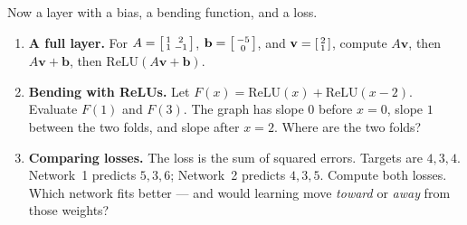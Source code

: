 \documentclass[10pt]{article}
\newcommand{\vv}{\mathbf{v}}
\newcommand{\bb}{\mathbf{b}}
\newcommand{\relu}{\mathrm{ReLU}}
\begin{document}
\begin{tcolorbox}[colback=white, colframe=black!40, title=\textbf{Tier A --- Approaching Proficiency},
    fonttitle=\bfseries, arc=1.5mm, left=3mm, right=3mm, top=2mm, bottom=2mm, breakable]
Now a layer with a bias, a bending function, and a loss.
\begin{enumerate}[leftmargin=1.7em, itemsep=9pt]
  \item \textbf{A full layer.} For $A=\begin{bsmallmatrix} 1 & 2\\ 1 & -1 \end{bsmallmatrix}$,
        $\bb=\begin{bsmallmatrix} -5\\ 0 \end{bsmallmatrix}$, and $\vv=\begin{bsmallmatrix} 2\\ 1 \end{bsmallmatrix}$,
        compute $A\vv$, then $A\vv+\bb$, then $\relu(A\vv+\bb)$. 
  \item \textbf{Bending with ReLUs.} Let $F(x)=\relu(x)+\relu(x-2)$. Evaluate $F(1)$ and $F(3)$. The graph
        has slope $0$ before $x=0$, slope $1$ between the two folds, and slope \blank{0.8cm} after $x=2$.
        Where are the two folds? \writeline
  \item \textbf{Comparing losses.} The loss is the sum of squared errors. Targets are $4,3,4$.
        Network~1 predicts $5,3,6$; Network~2 predicts $4,3,5$. Compute both losses. Which network fits
        better --- and would learning move \emph{toward} or \emph{away} from those weights? 
\end{enumerate}
\end{tcolorbox}
\end{document}
